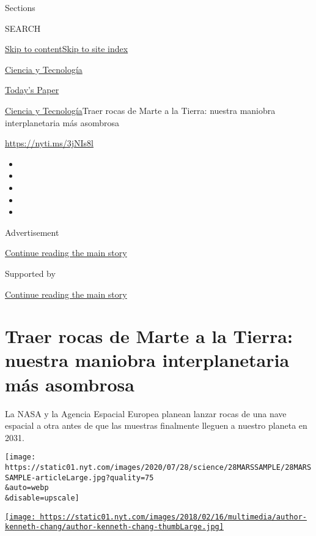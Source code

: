 Sections

SEARCH

\protect\hyperlink{site-content}{Skip to
content}\protect\hyperlink{site-index}{Skip to site index}

\href{https://www.nytimes.com/es/section/ciencia-y-tecnologia}{Ciencia y
Tecnología}

\href{https://myaccount.nytimes.com/auth/login?response_type=cookie\&client_id=vi}{}

\href{https://www.nytimes.com/section/todayspaper}{Today's Paper}

\href{/es/section/ciencia-y-tecnologia}{Ciencia y
Tecnología}\textbar{}Traer rocas de Marte a la Tierra: nuestra maniobra
interplanetaria más asombrosa

\url{https://nyti.ms/3jNIs8l}

\begin{itemize}
\item
\item
\item
\item
\item
\end{itemize}

Advertisement

\protect\hyperlink{after-top}{Continue reading the main story}

Supported by

\protect\hyperlink{after-sponsor}{Continue reading the main story}

\hypertarget{traer-rocas-de-marte-a-la-tierra-nuestra-maniobra-interplanetaria-muxe1s-asombrosa}{%
\section{Traer rocas de Marte a la Tierra: nuestra maniobra
interplanetaria más
asombrosa}\label{traer-rocas-de-marte-a-la-tierra-nuestra-maniobra-interplanetaria-muxe1s-asombrosa}}

La NASA y la Agencia Espacial Europea planean lanzar rocas de una nave
espacial a otra antes de que las muestras finalmente lleguen a nuestro
planeta en 2031.

\texttt{[image: https://static01.nyt.com/images/2020/07/28/science/28MARSSAMPLE/28MARSSAMPLE-articleLarge.jpg?quality=75\\\&auto=webp\\\&disable=upscale]}

\href{https://www.nytimes.com/by/kenneth-chang}{\texttt{[image: https://static01.nyt.com/images/2018/02/16/multimedia/author-kenneth-chang/author-kenneth-chang-thumbLarge.jpg]}}

